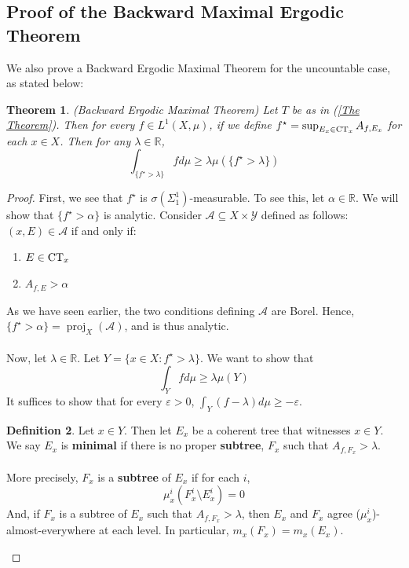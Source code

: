 \documentclass{article}
\DeclareMathOperator{\proj}{proj}
\newcommand{\CT}{\textmd{CT}}
\let\oldref\ref
\renewcommand{\ref}[1]{(\oldref{#1})}
\newtheorem{theorem}{Theorem}[section]
\theoremstyle{definition}
\newtheorem{definition}[theorem]{Definition}
\begin{document}
\subsection{Proof of the Backward Maximal Ergodic Theorem}
\noindent We also prove a Backward Ergodic Maximal Theorem for the uncountable case, as stated below: 
\begin{theorem}
    (Backward Ergodic Maximal Theorem) Let $ T $ be as in \ref{The Theorem}. Then for every $ f\in L^1(X,\mu) $, if we define $ f^\star  = \sup_{E_x\in \CT_x} A_{f,E_x} $ for each $ x\in X $. Then for any $ \lambda\in \mathbb{R} $, 
    \[
    \int_{\{f^\star>\lambda\}} f d\mu \geq \lambda \mu(\{f^\star>\lambda\})
    \]
\end{theorem}
\begin{proof}
    First, we see that $ f^\star $ is $ \sigma(\Sigma^1_1) $-measurable. To see this, let $ \alpha\in \mathbb{R} $. We will show that $ \{f^\star>\alpha\} $ is analytic. Consider $ \mathcal{A}\subseteq X\times \mathcal{Y} $ defined as follows: $ (x,E)\in \mathcal{A} $ if and only if:
    \begin{enumerate}
        \item $ E\in \CT_x $
        \item $ A_{f,E}>\alpha $
    \end{enumerate}
    As we have seen earlier, the two conditions defining $ \mathcal{A} $ are Borel. Hence, $ \{f^\star>\alpha\} = \proj_X(\mathcal{A}) $, and is thus analytic.\\\\
    Now, let $ \lambda\in \mathbb{R} $. Let $ Y = \{x\in X:f^\star>\lambda\} $. We want to show that
    \[
    \int_Y fd\mu \geq \lambda \mu(Y) 
    \]
    It suffices to show that for every $ \varepsilon>0 $, $\int_Y(f-\lambda)d\mu \geq -\varepsilon $.
    \begin{definition}\label{def for min}
        Let $ x\in Y $. Then let $ E_x $ be a coherent tree that witnesses $ x\in Y $. We say $ E_x $ is \textbf{minimal} if there is no proper \textbf{subtree}, $ F_x $ such that $ A_{f,F_x} > \lambda $. \\\\
        More precisely, $ F_x $ is a \textbf{subtree} of $ E_x $ if for each $ i $,
        \[
        \mu^i_x(F_x^i\setminus E_x^i) = 0
        \]
        And, if $ F_x $ is a subtree of $ E_x $ such that $ A_{f,F_x}>\lambda $, then $ E_x $ and $ F_x $ agree ($\mu_x^i$)-almost-everywhere at each level. In particular, $ m_x(F_x) = m_x(E_x) $.
    \end{definition}

\end{proof}
\end{document}
